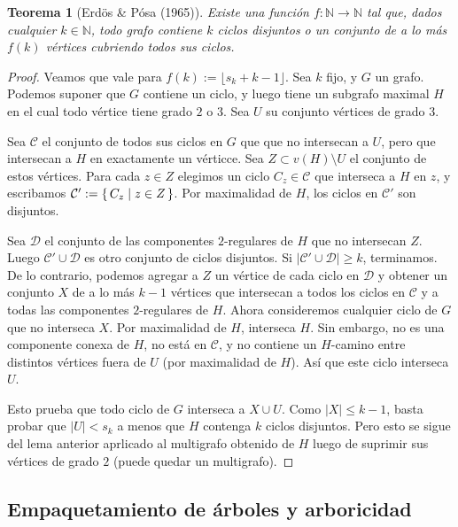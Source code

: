 \documentclass[12pt]{report}
\theoremstyle{plain}
\newtheorem{theorem}{Teorema}[section]
\theoremstyle{definition}
\newcommand{\naturals}{\mathbb{N}}
\newcommand{\abs}[1]{\left \vert #1 \right \vert}
\begin{document}
\begin{theorem}[Erdös \& Pósa (1965)]
Existe una función $f : \naturals \rightarrow \naturals$ tal que, dados cualquier $k \in \naturals$, todo grafo contiene $k$ ciclos disjuntos o un conjunto de a lo más $f(k)$ vértices cubriendo todos sus ciclos.
\end{theorem}
\begin{proof}
Veamos que vale para $f(k):= \lfloor s_k + k - 1 \rfloor$. Sea $k$ fijo, y $G$ un grafo. Podemos suponer que $G$ contiene un ciclo, y luego tiene un subgrafo maximal $H$ en  el cual todo vértice tiene grado $2$ o $3$. Sea $U$ su conjunto vértices de grado $3$.

Sea $\mathcal C$ el conjunto de todos sus ciclos en $G$ que que no intersecan a $U$, pero que intersecan a $H$ en exactamente un vérticce. Sea $Z\subset v(H) \setminus U$ el conjunto de estos vértices. Para cada $z \in Z$ elegimos un ciclo $C_z \in \mathcal C$ que interseca a $H$ en $z$, y escribamos $\mathcal C ' := \set{C_z | z \in Z}$. Por maximalidad de $H$, los ciclos en $\mathcal C'$ son disjuntos.

Sea $\mathcal D$ el conjunto de las componentes $2$-regulares de $H$ que no intersecan $Z$. Luego $\mathcal C' \cup \mathcal D$ es otro conjunto de ciclos disjuntos. Si $\abs{\mathcal C ' \cup \mathcal D} \geq k$, terminamos. De lo contrario, podemos agregar a $Z$ un vértice de cada ciclo en $\mathcal D$ y obtener un conjunto $X$ de a lo más $k-1$ vértices que intersecan a todos los ciclos en $\mathcal C$ y a todas las componentes $2$-regulares de $H$. Ahora consideremos cualquier ciclo de $G$ que no interseca $X$. Por maximalidad de $H$, interseca $H$. Sin embargo, no es una componente conexa de $H$, no está en $\mathcal C$, y no contiene un $H$-camino entre distintos vértices fuera de $U$ (por maximalidad de $H$). Así que este ciclo interseca $U$.

Esto prueba que todo ciclo de $G$ interseca a $X \cup U$. Como $\abs X \leq k-1$, basta probar que $\abs U < s_k$ a menos que $H$ contenga $k$ ciclos disjuntos. Pero esto se sigue del lema anterior aprlicado al multigrafo obtenido de $H$ luego de suprimir sus vértices de grado $2$ (puede quedar un multigrafo).
\end{proof}




\subsection{Empaquetamiento de árboles y arboricidad}
\end{document}

